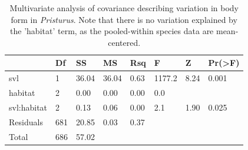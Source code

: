 \documentclass[
  11pt,
]{article}
\begin{document}
\newpage

\begin{table}[H]

\caption{\label{tab:unnamed-chunk-2}Multivariate analysis of covariance describing variation in body form in \textit{Pristurus}. Note that there is no variation explained by the 'habitat' term, as the pooled-within species data are mean-centered.}
\centering
\begin{tabular}[t]{llllllll}
\toprule
  & Df & SS & MS & Rsq & F & Z & Pr(>F)\\
\midrule
svl & 1 & 36.04 & 36.04 & 0.63 & 1177.2 & 8.24 & 0.001\\
habitat & 2 & 0.00 & 0.00 & 0.00 & 0.0 &  & \\
svl:habitat & 2 & 0.13 & 0.06 & 0.00 & 2.1 & 1.90 & 0.025\\
Residuals & 681 & 20.85 & 0.03 & 0.37 &  &  & \\
Total & 686 & 57.02 &  &  &  &  & \\
\bottomrule
\end{tabular}
\end{table}

\newpage
\end{document}

